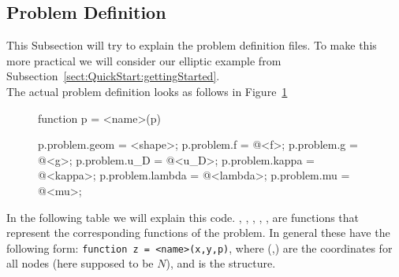 \subsection{Problem Definition}
\label{sect:QuickStart:ProblemDefinition}

This Subsection will try to explain the problem definition files. To make this more practical we will consider our elliptic example from Subsection~\ref{sect:QuickStart:gettingStarted}.\medskip\\
The actual problem definition looks as follows in Figure~\ref{sect:QuickStart.fig.problemDefinition}
\begin{figure}[ht!]

\begin{pcode}
function p = <name>(p)

p.problem.geom = <shape>;
p.problem.f = @<f>;
p.problem.g = @<g>;
p.problem.u_D = @<u_D>;
p.problem.kappa = @<kappa>;
p.problem.lambda = @<lambda>;
p.problem.mu = @<mu>;
\end{pcode}
\caption{}\label{sect:QuickStart.fig.problemDefinition}
\end{figure}

\noindent In the following table we will explain this code. , , , , ,  are functions that represent the corresponding functions of the problem. In general these have the following form:
\verb"function z = <name>(x,y,p)", where (,) are the coordinates for all nodes (here supposed to be $N$), and  is the structure.\medskip

